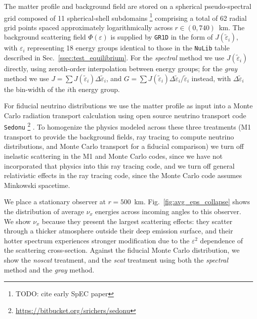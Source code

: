 \documentclass[aps,floatfix,prd,superscriptaddress,twocolumn]{revtex4-1}
\begin{document}
The matter profile and background field are stored on a spherical
pseudo-spectral grid composed of 11 spherical-shell subdomains
\footnote{TODO: cite early SpEC paper}
comprising a total of 62 radial grid points spaced approximately
logarithmically across $r\in(0,740)$~km.
The background scattering field $\Phi(\varepsilon)$ is supplied by
\lstinline{GR1D} in the form of $J(\tilde{\varepsilon}_i)$,
with $\varepsilon_i$ representing 18 energy groups
identical to those in the \lstinline{NuLib} table described in
Sec.~\ref{ssec:test_equilibrium}.
For the \emph{spectral} method we use $J(\tilde{\varepsilon}_i)$ directly,
using zeroth-order interpolation between energy groups;
for the \emph{gray} method we use $J=\sum J(\tilde{\varepsilon}_i) \Delta\tilde{\varepsilon}_i$,
and $G=\sum J(\tilde{\varepsilon}_i) \Delta\tilde{\varepsilon}_i/\tilde{\varepsilon}_i$ instead,
with $\Delta\tilde{\varepsilon}_i$ the bin-width of the $i$th energy group.

For fiducial neutrino distributions we use the matter profile
as input into a Monte Carlo radiation transport calculation using
open source neutrino transport code \lstinline{Sedonu}
\footnote{\url{https://bitbucket.org/srichers/sedonu}}
\cite{rich2015-monte_carlo}.
To homogenize the physics modeled across these three treatments
(M1 transport to provide the background fields,
ray tracing to compute neutrino distributions, and
Monte Carlo transport for a fiducial comparison)
we turn off inelastic scattering in the M1 and Monte Carlo codes,
since we have not incorporated that physics into this ray tracing code,
and we turn off general relativistic effects in the ray tracing code,
since the Monte Carlo code assumes Minkowski spacetime.

We place a stationary observer at $r=500$~km.
Fig.~\ref{fig:avg_eps_collapse} shows the distribution of average $\nu_x$
energies across incoming angles to this observer.
We show $\nu_x$ because they present the largest scattering effects:
they scatter through a thicker atmosphere outside their deep emission surface,
and their hotter spectrum experiences stronger modification due to the
$\varepsilon^2$ dependence of the scattering cross-section.
Against the fiducial Monte Carlo distribution, we show the
\emph{noscat} treatment, and the \emph{scat} treatment using both the
\emph{spectral} method and the \emph{gray} method.
\end{document}

